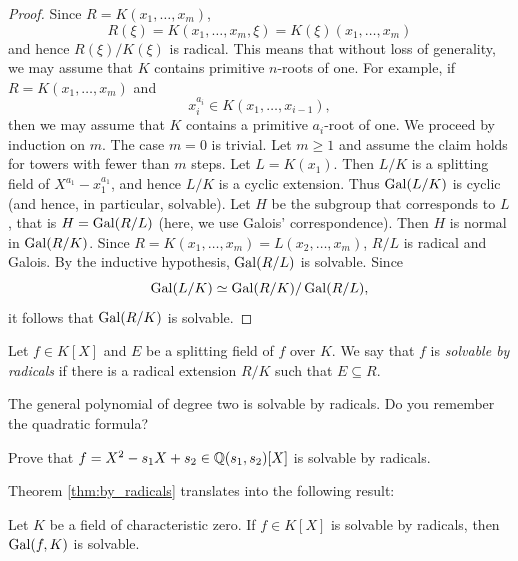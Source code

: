 \begin{proof}
    Since
    $R=K(x_1,\dots,x_m)$,  
    \[
    R(\xi)=K(x_1,\dots,x_m,\xi)=K(\xi)(x_1,\dots,x_m)
    \]
    and hence $R(\xi)/K(\xi)$ is radical. 
    This means that
    without loss of generality, we may assume that
    $K$ contains primitive $n$-roots of one. For example, 
    if $R=K(x_1,\dots,x_m)$ and 
    \[
    x_i^{a_i}\in K(x_1,\dots,x_{i-1}),
    \] 
    then we may assume that $K$ contains a primitive $a_i$-root of one. We proceed by induction on $m$. 
    The case $m=0$ is trivial.
    Let $m\geq1$ and assume the claim holds for towers with fewer than $m$ steps.
    Let 
    $L=K(x_1)$. Then $L/K$ is a splitting field of $X^{a_1}-x_1^{a_1}$, and hence
    $L/K$ is a cyclic extension. Thus $\operatorname{Gal}(L/K)$ is cyclic (and hence, in particular, solvable). 
    Let $H$ be the subgroup that corresponds to $L$, that is
    $H=\operatorname{Gal}(R/L)$ (here, we use Galois' correspondence). Then $H$ is normal in $\operatorname{Gal}(R/K)$. 
    Since $R=K(x_1,\dots,x_m)=L(x_2,\dots,x_m)$, $R/L$ is radical and Galois. By the inductive hypothesis, 
    $\operatorname{Gal}(R/L)$ is solvable. Since 
    \[
    \operatorname{Gal}(L/K)\simeq \operatorname{Gal}(R/K)/\operatorname{Gal}(R/L),
    \]
    it follows that $\operatorname{Gal}(R/K)$ is solvable. 
\end{proof}

\begin{definition}
    Let $f\in K[X]$ and $E$ be a splitting field of $f$ over $K$. 
    We say that $f$ is \emph{solvable by radicals} if
    there is a radical extension $R/K$ such that $E\subseteq R$. 
\end{definition}

The general polynomial of degree two 
is solvable by radicals. Do you remember the quadratic 
formula? 

\begin{exercise}
    Prove that $f=X^2-s_1X+s_2\in \mathbb{Q}(s_1,s_2)[X]$ is solvable by radicals. 
\end{exercise}

Theorem \ref{thm:by_radicals} translates into the following result:

\begin{exercise}
    Let $K$ be a field of characteristic zero. 
    If $f\in K[X]$ is solvable by radicals, then $\operatorname{Gal}(f,K)$ is solvable. 
\end{exercise}

